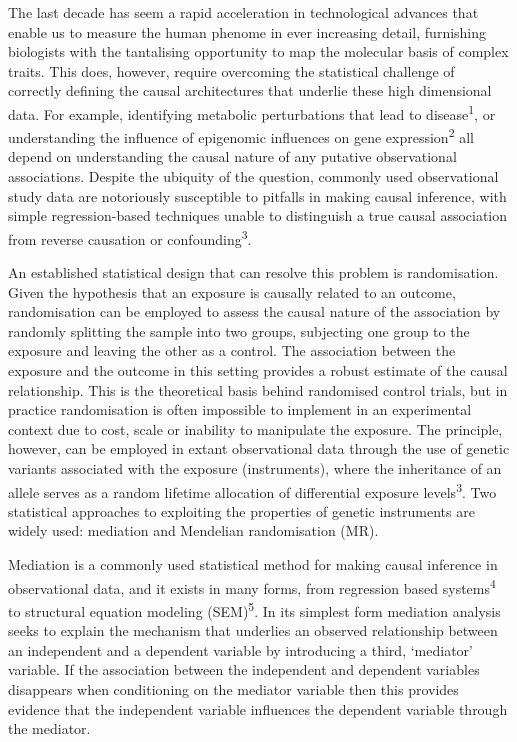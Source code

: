 \documentclass[]{article}
\begin{document}
The last decade has seem a rapid acceleration in technological advances
that enable us to measure the human phenome in ever increasing detail,
furnishing biologists with the tantalising opportunity to map the
molecular basis of complex traits. This does, however, require
overcoming the statistical challenge of correctly defining the causal
architectures that underlie these high dimensional data. For example,
identifying metabolic perturbations that lead to
disease\textsuperscript{1}, or understanding the influence of epigenomic
influences on gene expression\textsuperscript{2} all depend on
understanding the causal nature of any putative observational
associations. Despite the ubiquity of the question, commonly used
observational study data are notoriously susceptible to pitfalls in
making causal inference, with simple regression-based techniques unable
to distinguish a true causal association from reverse causation or
confounding\textsuperscript{3}.

An established statistical design that can resolve this problem is
randomisation. Given the hypothesis that an exposure is causally related
to an outcome, randomisation can be employed to assess the causal nature
of the association by randomly splitting the sample into two groups,
subjecting one group to the exposure and leaving the other as a control.
The association between the exposure and the outcome in this setting
provides a robust estimate of the causal relationship. This is the
theoretical basis behind randomised control trials, but in practice
randomisation is often impossible to implement in an experimental
context due to cost, scale or inability to manipulate the exposure. The
principle, however, can be employed in extant observational data through
the use of genetic variants associated with the exposure (instruments),
where the inheritance of an allele serves as a random lifetime
allocation of differential exposure levels\textsuperscript{3}. Two
statistical approaches to exploiting the properties of genetic
instruments are widely used: mediation and Mendelian randomisation (MR).

Mediation is a commonly used statistical method for making causal
inference in observational data, and it exists in many forms, from
regression based systems\textsuperscript{4} to structural equation
modeling (SEM)\textsuperscript{5}. In its simplest form mediation
analysis seeks to explain the mechanism that underlies an observed
relationship between an independent and a dependent variable by
introducing a third, `mediator' variable. If the association between the
independent and dependent variables disappears when conditioning on the
mediator variable then this provides evidence that the independent
variable influences the dependent variable through the mediator.
\end{document}

